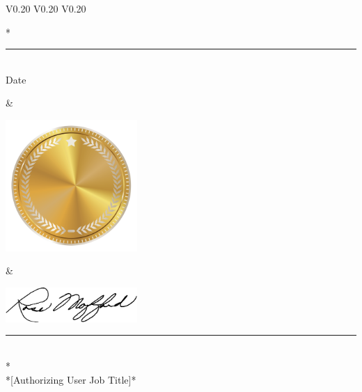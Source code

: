 \documentclass{article}
\begin{document}
\setlength{\tabcolsep}{12pt}
\begin{table}[h]
  \centering
  \begin{tabular} {V{0.20\paperwidth} V{0.20\paperwidth} V{0.20\paperwidth} }       
    \vspace{0pt}\parbox[b][1cm][b]{5cm}{\huge\selectfont {}* \\
    \rule{5cm}{0.4pt} \\
    \normalsize\selectfont \centering Date \\
    \phantom{Date}}                                                            &   
    \vspace{0pt}\parbox[b][1cm][c]{5cm}{\includegraphics[width=5cm]{images/goldseal}} &   
    \vspace{0pt}\parbox[b][1cm][b]{5cm}{\includegraphics[width=5cm]{images/rose_mofford_signature} \\
    \rule{5cm}{0.4pt} \\
    \normalsize\selectfont {}* \\
    *[Authorizing User Job Title]*}
  \end{tabular}
\end{table}
\end{document}
